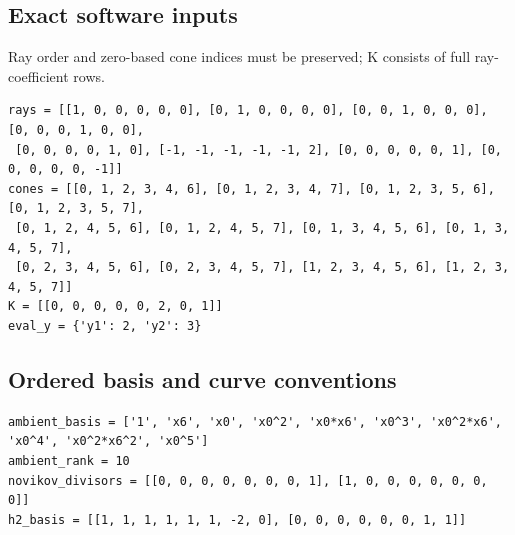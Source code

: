 \documentclass[10pt,a4paper]{article}
\begin{document}
\subsection*{Exact software inputs}
Ray order and zero-based cone indices must be preserved; K consists of full ray-coefficient rows.
\begin{lstlisting}
rays = [[1, 0, 0, 0, 0, 0], [0, 1, 0, 0, 0, 0], [0, 0, 1, 0, 0, 0], [0, 0, 0, 1, 0, 0],
 [0, 0, 0, 0, 1, 0], [-1, -1, -1, -1, -1, 2], [0, 0, 0, 0, 0, 1], [0, 0, 0, 0, 0, -1]]
cones = [[0, 1, 2, 3, 4, 6], [0, 1, 2, 3, 4, 7], [0, 1, 2, 3, 5, 6], [0, 1, 2, 3, 5, 7],
 [0, 1, 2, 4, 5, 6], [0, 1, 2, 4, 5, 7], [0, 1, 3, 4, 5, 6], [0, 1, 3, 4, 5, 7],
 [0, 2, 3, 4, 5, 6], [0, 2, 3, 4, 5, 7], [1, 2, 3, 4, 5, 6], [1, 2, 3, 4, 5, 7]]
K = [[0, 0, 0, 0, 0, 2, 0, 1]]
eval_y = {'y1': 2, 'y2': 3}
\end{lstlisting}
\subsection*{Ordered basis and curve conventions}
\begin{lstlisting}
ambient_basis = ['1', 'x6', 'x0', 'x0^2', 'x0*x6', 'x0^3', 'x0^2*x6', 'x0^4', 'x0^2*x6^2', 'x0^5']
ambient_rank = 10
novikov_divisors = [[0, 0, 0, 0, 0, 0, 0, 1], [1, 0, 0, 0, 0, 0, 0, 0]]
h2_basis = [[1, 1, 1, 1, 1, 1, -2, 0], [0, 0, 0, 0, 0, 0, 1, 1]]
\end{lstlisting}
\end{document}
